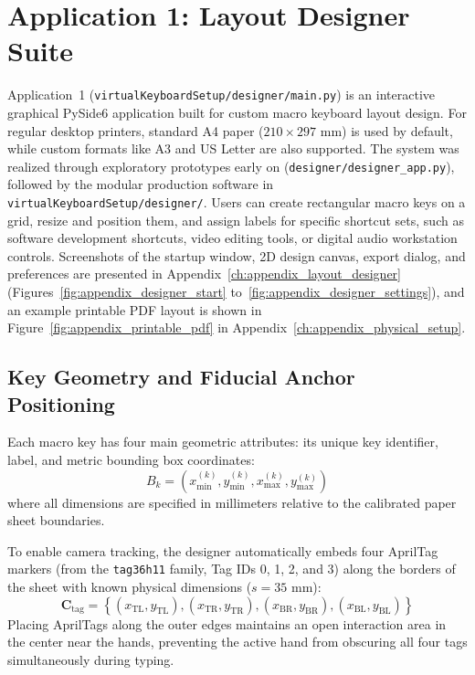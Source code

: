 \section{Application 1: Layout Designer Suite}
\label{sec:meth_layout_designer}
Application~1 (\texttt{virtualKeyboardSetup/designer/main.py}) is an interactive graphical PySide6 application built for custom macro keyboard layout design. For regular desktop printers, standard A4 paper ($210 \times 297\text{ mm}$) is used by default, while custom formats like A3 and US Letter are also supported. The system was realized through exploratory prototypes early on (\texttt{designer/designer\_app.py}), followed by the modular production software in \texttt{virtualKeyboardSetup/designer/}. Users can create rectangular macro keys on a grid, resize and position them, and assign labels for specific shortcut sets, such as software development shortcuts, video editing tools, or digital audio workstation controls. Screenshots of the startup window, 2D design canvas, export dialog, and preferences are presented in Appendix~\ref{ch:appendix_layout_designer} (Figures~\ref{fig:appendix_designer_start} to~\ref{fig:appendix_designer_settings}), and an example printable PDF layout is shown in Figure~\ref{fig:appendix_printable_pdf} in Appendix~\ref{ch:appendix_physical_setup}.

\subsection{Key Geometry and Fiducial Anchor Positioning}
\label{subsec:meth_key_geometry}
Each macro key has four main geometric attributes: its unique key identifier, label, and metric bounding box coordinates:
\begin{equation}
B_k = \left( x_{\min}^{(k)}, y_{\min}^{(k)}, x_{\max}^{(k)}, y_{\max}^{(k)} \right)
\label{eq:meth_key_box}
\end{equation}
where all dimensions are specified in millimeters relative to the calibrated paper sheet boundaries.

To enable camera tracking, the designer automatically embeds four AprilTag markers (from the \texttt{tag36h11} family, Tag IDs 0, 1, 2, and 3) along the borders of the sheet with known physical dimensions ($s = 35\text{ mm}$):
\begin{equation}
\mathbf{C}_{\text{tag}} = \left\{ (x_{\text{TL}}, y_{\text{TL}}), (x_{\text{TR}}, y_{\text{TR}}), (x_{\text{BR}}, y_{\text{BR}}), (x_{\text{BL}}, y_{\text{BL}}) \right\}
\label{eq:meth_tag_coords}
\end{equation}
Placing AprilTags along the outer edges maintains an open interaction area in the center near the hands, preventing the active hand from obscuring all four tags simultaneously during typing.

